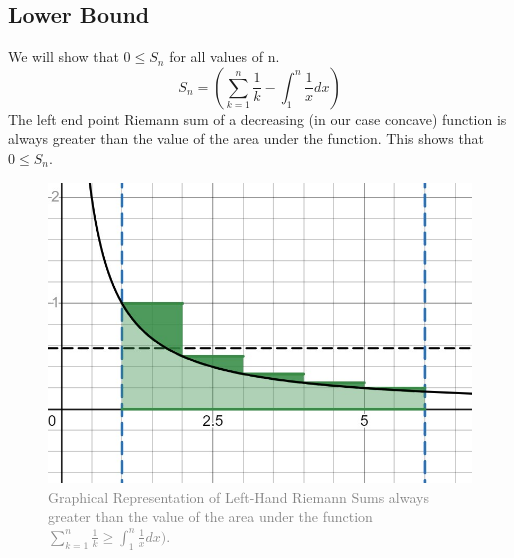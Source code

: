 \documentclass{article}
\begin{document}
\subsection{Lower Bound}
We will show that $0\leq S_n$ for all values of n.
$$S_n=(\sum_{k=1}^{n}\frac{1}{k} - \int_{1}^{n} \frac{1}{x}dx)$$
The left end point Riemann sum of a decreasing (in our case concave) function is always greater than the value of the area under the function. This shows that $0\leq S_n$.
\begin{figure}[htp]
    \centering
    \includegraphics[scale=0.25]{Lower Bound Graph.jpg}
    \caption{\textcolor{gray}{Graphical Representation of Left-Hand Riemann Sums always greater than the value of the area under the function $\sum_{k=1}^{n}\frac{1}{k} \geq \int_{1}^{n} \frac{1}{x}dx)$.}}
    \label{fig:Riemann Sums}
\end{figure}  
\FloatBarrier
\end{document}
